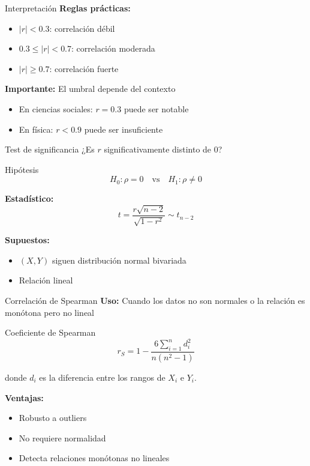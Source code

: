 \documentclass[aspectratio=169]{beamer}
\begin{document}
\begin{frame}{Interpretación}
\textbf{Reglas prácticas:}
\begin{itemize}
    \item $|r| < 0.3$: correlación débil
    \item $0.3 \leq |r| < 0.7$: correlación moderada
    \item $|r| \geq 0.7$: correlación fuerte
\end{itemize}

\vspace{0.5cm}
\textbf{Importante:} El umbral depende del contexto
\begin{itemize}
    \item En ciencias sociales: $r = 0.3$ puede ser notable
    \item En física: $r < 0.9$ puede ser insuficiente
\end{itemize}
\end{frame}

\begin{frame}{Test de significancia}
¿Es $r$ significativamente distinto de 0?

\begin{block}{Hipótesis}
\[
H_0: \rho = 0 \quad \text{vs} \quad H_1: \rho \neq 0
\]
\end{block}

\textbf{Estadístico:}
\[
t = \frac{r\sqrt{n-2}}{\sqrt{1-r^2}} \sim t_{n-2}
\]

\vspace{0.5cm}
\textbf{Supuestos:}
\begin{itemize}
    \item $(X, Y)$ siguen distribución normal bivariada
    \item Relación lineal
\end{itemize}
\end{frame}

\begin{frame}{Correlación de Spearman}
\textbf{Uso:} Cuando los datos no son normales o la relación es monótona pero no lineal

\vspace{0.3cm}
\begin{block}{Coeficiente de Spearman}
\[
r_S = 1 - \frac{6\sum_{i=1}^{n} d_i^2}{n(n^2-1)}
\]
\end{block}

donde $d_i$ es la diferencia entre los rangos de $X_i$ e $Y_i$.

\vspace{0.5cm}
\textbf{Ventajas:}
\begin{itemize}
    \item Robusto a outliers
    \item No requiere normalidad
    \item Detecta relaciones monótonas no lineales
\end{itemize}
\end{frame}
\end{document}
